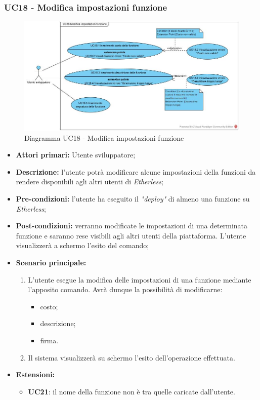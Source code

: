 \subsubsection{UC18 - Modifica impostazioni funzione}
\begin{figure}[h]
	\centering
	\includegraphics[width=\linewidth]{res/img/UC18.jpg}
	\caption{Diagramma UC18 - Modifica impostazioni funzione}
\end{figure}
\begin{itemize}
	\item \textbf{Attori primari:} Utente sviluppatore;
	\item \textbf{Descrizione:} l'utente potrà modificare alcune impostazioni della funzioni da rendere disponibili agli altri utenti di \textit{Etherless};
	\item \textbf{Pre-condizioni:} l'utente ha eseguito il \textit{"deploy\glos"} di almeno una funzione su \textit{Etherless};
	\item \textbf{Post-condizioni:} verranno modificate le impostazioni di una determinata funzione e saranno rese visibili agli altri utenti della piattaforma. L'utente visualizzerà a schermo l'esito del comando;
	\item \textbf{Scenario principale:}
	\begin{enumerate}
		\item L'utente esegue la modifica delle impostazioni di una funzione mediante l'apposito comando. Avrà dunque la possibilità di modificarne:
		\begin{itemize}
			\item costo;
			\item descrizione;
			\item firma.
		\end{itemize}
		\item Il sistema visualizzerà su schermo l'esito dell'operazione effettuata.
	\end{enumerate}
	\item\textbf{Estensioni:}
	\begin{itemize}
		\item \textbf{UC21}: il nome della funzione non è tra quelle caricate dall'utente.
	\end{itemize}
\end{itemize}
